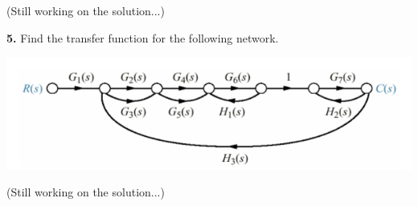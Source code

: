 \documentclass[11pt]{report}
\begin{document}
(Still working on the solution...)

\newpage

\noindent
{\bf 5.} Find the transfer function for the following network.
\begin{center}
\includegraphics[scale=0.5]{images/210-4.png}
\end{center}

(Still working on the solution...)
\end{document}
